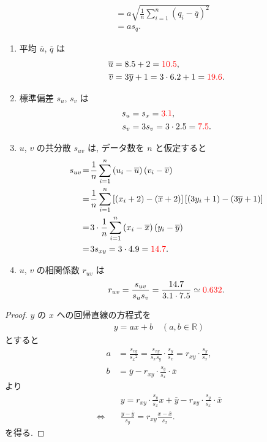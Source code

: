 \begin{qenumerate}
{\begin{align}
				&= a\sqrt{\frac{1}{n}\sum_{i = 1}^{n}{\left(q_{i} - \overline{q}\right)^{2}}} \\
				&= as_{q}.
		\end{align}
		\begin{enumerate}
			\item{
				平均 $\overline{u}$, $\overline{q}$ は
				\begin{align}
					\overline{u} &= 8.5 + 2 = \textcolor{red}{10.5}, \\
					\overline{v} &= 3\overline{y} + 1 = 3\cdot 6.2 + 1 = \textcolor{red}{19.6}.
				\end{align}
			}
			\item{
				標準偏差 $s_{u}$, $s_{v}$ は
				\begin{align}
					s_{u} &= s_{x} = \textcolor{red}{3.1}, \\
					s_{v} &= 3s_{v} = 3\cdot 2.5 = \textcolor{red}{7.5}.
				\end{align}
			}
			\item{
				$u$, $v$ の共分散 $s_{uv}$ は, データ数を $n$ と仮定すると
				\begin{align}
					s_{uv} \! &= \! \frac{1}{n}\sum_{i = 1}^{n}{\left(u_{i} - \overline{u}\right)\left(v_{i} - \overline{v}\right)} \\
						\! &= \! \frac{1}{n}\sum_{i = 1}^{n}{\left[\left(x_{i} + 2\right) - \left(\overline{x} + 2\right)\right]\left[\left(3y_{i} + 1\right) - \left(3\overline{y} + 1\right)\right]} \\
						\! &= \! 3\cdot \frac{1}{n}\sum_{i = 1}^{n}{\left(x_{i} - \overline{x}\right)\left(y_{i} - \overline{y}\right)} \\
						\! &= \! 3s_{xy} = 3\cdot 4.9 = \red{14.7}.
				\end{align}
			}
			\item{
				$u$, $v$ の相関係数 $r_{uv}$ は
				\begin{align}
					r_{uv} = \frac{s_{uv}}{s_{u}s_{v}} = \frac{14.7}{3.1\cdot 7.5} \simeq \textcolor{red}{0.632}.
				\end{align}
			}
		\end{enumerate}
	}
	\item{
		\begin{proof}
			$y$ の $x$ への回帰直線の方程式を
			\begin{align}
				y = ax + b\quad (a, b\in\mathbb{R})
			\end{align}
			とすると
			\begin{align}
				a &= \frac{s_{xy}}{{s_{x}}^{2}} = \frac{s_{xy}}{s_{x}s_{y}}\cdot \frac{s_{y}}{s_{x}} = r_{xy}\cdot \frac{s_{y}}{s_{x}}, \\
				b &= \overline{y} - r_{xy}\cdot \frac{s_{y}}{s_{x}}\cdot \overline{x}
			\end{align}
			より
			\begin{align}
				& y = r_{xy}\cdot \frac{s_{y}}{s_{x}}x + \overline{y} - r_{xy}\cdot \frac{s_{y}}{s_{x}}\cdot \overline{x} \\
				\Leftrightarrow\quad & \frac{y - \overline{y}}{s_{y}} = r_{xy}\frac{x - \overline{x}}{s_{x}}.
			\end{align}
			を得る.
		\end{proof}
	}
\end{qenumerate}